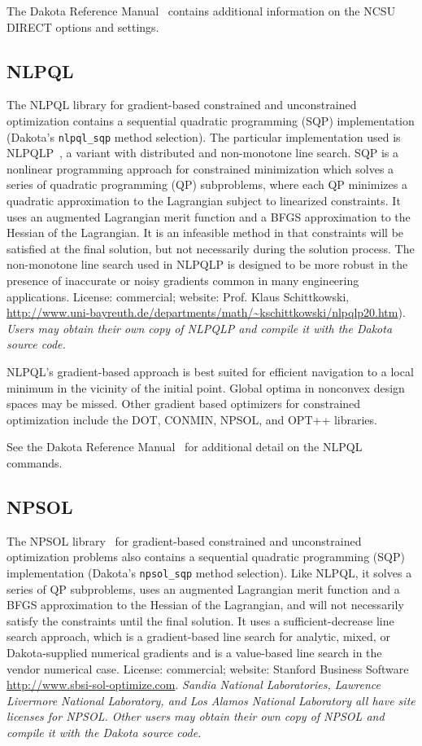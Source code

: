 The Dakota Reference Manual~\cite{RefMan} contains additional
information on the NCSU DIRECT options and settings.

\subsection{NLPQL}\label{opt:software:nlpql}

The NLPQL library for gradient-based constrained and unconstrained
optimization contains a sequential quadratic programming (SQP)
implementation (Dakota's \texttt{nlpql\_sqp} method selection).  The
particular implementation used is NLPQLP~\cite{Sch04}, a variant with
distributed and non-monotone line search.  SQP is a nonlinear
programming approach for constrained minimization which solves a
series of quadratic programming (QP) subproblems, where each QP
minimizes a quadratic approximation to the Lagrangian subject to
linearized constraints. It uses an augmented Lagrangian merit function
and a BFGS approximation to the Hessian of the Lagrangian. It is an
infeasible method in that constraints will be satisfied at the final
solution, but not necessarily during the solution process.  The
non-monotone line search used in NLPQLP is designed to be more robust
in the presence of inaccurate or noisy gradients common in many
engineering applications.  License: commercial; website: Prof. Klaus
Schittkowski,
\url{http://www.uni-bayreuth.de/departments/math/~kschittkowski/nlpqlp20.htm}).
\emph{Users may obtain their own copy of NLPQLP and compile it with
  the Dakota source code.}

NLPQL's gradient-based approach is best suited for efficient
navigation to a local minimum in the vicinity of the initial point.
Global optima in nonconvex design spaces may be missed. Other gradient
based optimizers for constrained optimization include the DOT, CONMIN,
NPSOL, and OPT++ libraries.

See the Dakota Reference Manual~\cite{RefMan} for additional detail on
the NLPQL commands. 

\subsection{NPSOL}\label{opt:software:npsol}

The NPSOL library~\cite{Gil86} for gradient-based constrained and
unconstrained optimization problems also contains a sequential
quadratic programming (SQP) implementation (Dakota's
\texttt{npsol\_sqp} method selection).  Like NLPQL, it solves a series
of QP subproblems, uses an augmented Lagrangian merit function and a
BFGS approximation to the Hessian of the Lagrangian, and will not
necessarily satisfy the constraints until the final solution.  It uses
a sufficient-decrease line search approach, which is a gradient-based
line search for analytic, mixed, or Dakota-supplied numerical
gradients and is a value-based line search in the vendor numerical
case.  License: commercial; website: Stanford Business Software
\url{http://www.sbsi-sol-optimize.com}.  {\em Sandia National
  Laboratories, Lawrence Livermore National Laboratory, and Los Alamos
  National Laboratory all have site licenses for NPSOL. Other users
  may obtain their own copy of NPSOL and compile it with the Dakota
  source code.}

